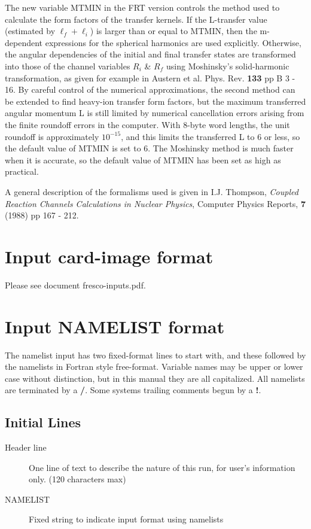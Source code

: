 \documentclass[11pt]{article}
\begin{document}
The new variable MTMIN in the FRT version controls the method used to
calculate the form factors of the transfer kernels. If the L-transfer value
(estimated by $\ell_f + \ell_i$)
is larger than or equal to MTMIN, then the m-dependent expressions for the
spherical harmonics are used explicitly.
Otherwise, the
angular dependencies of the initial and final transfer states
are transformed into those of the channel variables $R_{i}$ \& $R_{f}$ using
Moshinsky's solid-harmonic transformation, as given for example
in
Austern et al. Phys. Rev. {\bf 133} pp B 3 - 16.
%
By careful control of the numerical approximations, the second method can
be extended to find heavy-ion transfer form factors, but the maximum
transferred angular momentum L is still limited by numerical cancellation
errors arising from the finite roundoff errors in the computer.
With 8-byte word lengths, the unit roundoff is approximately $10^{-15}$,
and this limits the transferred L to 6 or less, so the default value
of MTMIN is set to 6. The Moshinsky method is much faster when it is
accurate, so the default value of MTMIN has been set as high as practical.

A general description of the formalisms used is given in
I.J. Thompson,
{\em Coupled Reaction Channels Calculations in Nuclear Physics},
Computer Physics Reports, {\bf 7} (1988) pp 167 - 212.

\newpage
\section{Input card-image format}
Please see document   fresco-inputs.pdf.
\section{Input NAMELIST format}
The namelist input has two fixed-format lines to start with, and these followed by the namelists in Fortran style free-format. 
Variable names may be upper or lower case without distinction, but in this manual they are all capitalized.
All namelists are terminated by a {\bf /}. Some systems trailing comments begun by a {\bf !}.

\subsection{Initial Lines}
\begin{description}
\item[Header line] \hfill 

One line of text to describe the nature of this run, for user's information only. (120 characters max)
\item[NAMELIST] \hfill 

Fixed string to indicate input format using namelists
\end{description}
\end{document}
